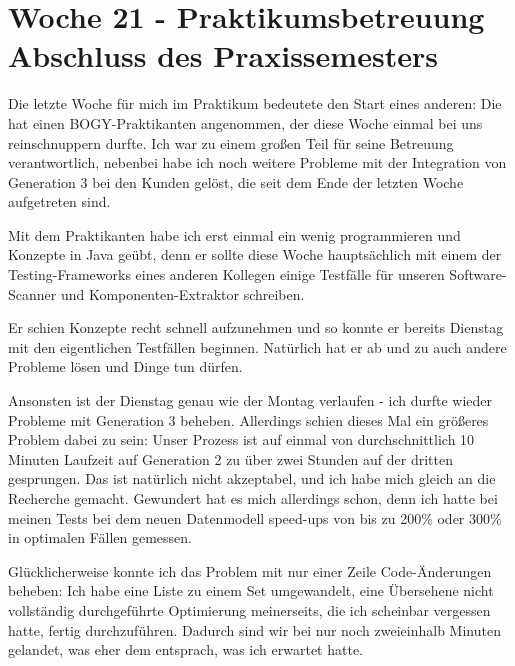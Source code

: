 \section{Woche 21 - Praktikumsbetreuung \headerand Abschluss des Praxissemesters} \label{sec:bericht-wo-21-initial}


\lweekdaymarginpar{\weekdayMondayLong}

Die letzte Woche für mich im Praktikum bedeutete den Start eines anderen:
Die {\metaeffekt} hat einen BOGY-Praktikanten angenommen, der diese Woche einmal bei uns reinschnuppern durfte.
Ich war zu einem großen Teil für seine Betreuung verantwortlich, nebenbei habe ich noch weitere Probleme mit der Integration von Generation 3 bei den Kunden gelöst, die seit dem Ende der letzten Woche aufgetreten sind.

Mit dem Praktikanten habe ich erst einmal ein wenig programmieren und Konzepte in Java geübt, denn er sollte diese Woche hauptsächlich mit einem der Testing-Frameworks eines anderen Kollegen einige Testfälle für unseren Software-Scanner und Komponenten-Extraktor schreiben.

\sweekdaymarginpar{\weekdayTuesdayLong}

Er schien Konzepte recht schnell aufzunehmen und so konnte er bereits Dienstag mit den eigentlichen Testfällen beginnen.
Natürlich hat er ab und zu auch andere Probleme lösen und Dinge tun dürfen.

Ansonsten ist der Dienstag genau wie der Montag verlaufen - ich durfte wieder Probleme mit Generation 3 beheben.
Allerdings schien dieses Mal ein größeres Problem dabei zu sein:
Unser Prozess ist auf einmal von durchschnittlich 10 Minuten Laufzeit auf Generation 2 zu über zwei Stunden auf der dritten gesprungen.
Das ist natürlich nicht akzeptabel, und ich habe mich gleich an die Recherche gemacht.
Gewundert hat es mich allerdings schon, denn ich hatte bei meinen Tests bei dem neuen Datenmodell speed-ups von bis zu 200\% oder 300\% in optimalen Fällen gemessen.

Glücklicherweise konnte ich das Problem mit nur einer Zeile Code-Änderungen beheben:
Ich habe eine Liste zu einem Set umgewandelt, eine Übersehene nicht vollständig durchgeführte Optimierung meinerseits, die ich scheinbar vergessen hatte, fertig durchzuführen.
Dadurch sind wir bei nur noch zweieinhalb Minuten gelandet, was eher dem entsprach, was ich erwartet hatte.

\sweekdaymarginpar{\weekdayWednesdayShort, \weekdayThursdayShort}

